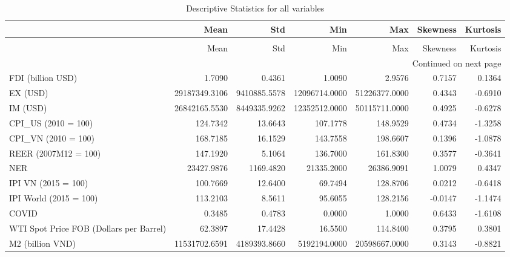 \begin{longtable}{lrrrrrr}
\caption{Descriptive Statistics for all variables} \label{tab:desc_stats} \\
\toprule
 & Mean & Std & Min & Max & Skewness & Kurtosis \\
\midrule
\endfirsthead
\caption[]{Descriptive Statistics for all variables} \\
\toprule
 & Mean & Std & Min & Max & Skewness & Kurtosis \\
\midrule
\endhead
\midrule
\multicolumn{7}{r}{Continued on next page} \\
\midrule
\endfoot
\bottomrule
\endlastfoot
FDI (billion USD) & 1.7090 & 0.4361 & 1.0090 & 2.9576 & 0.7157 & 0.1364 \\
EX (USD) & 29187349.3106 & 9410885.5578 & 12096714.0000 & 51226377.0000 & 0.4343 & -0.6910 \\
IM (USD) & 26842165.5530 & 8449335.9262 & 12352512.0000 & 50115711.0000 & 0.4925 & -0.6278 \\
CPI\_US (2010 = 100) & 124.7342 & 13.6643 & 107.1778 & 148.9529 & 0.4734 & -1.3258 \\
CPI\_VN (2010 = 100) & 168.7185 & 16.1529 & 143.7558 & 198.6607 & 0.1396 & -1.0878 \\
REER (2007M12 = 100) & 147.1920 & 5.1064 & 136.7000 & 161.8300 & 0.3577 & -0.3641 \\
NER & 23427.9876 & 1169.4820 & 21335.2000 & 26386.9091 & 1.0079 & 0.4347 \\
IPI VN (2015 = 100) & 100.7669 & 12.6400 & 69.7494 & 128.8706 & 0.0212 & -0.6418 \\
IPI World (2015 = 100) & 113.2103 & 8.5611 & 95.6055 & 128.2156 & -0.0147 & -1.1474 \\
COVID & 0.3485 & 0.4783 & 0.0000 & 1.0000 & 0.6433 & -1.6108 \\
WTI Spot Price FOB (Dollars per Barrel) & 62.3897 & 17.4428 & 16.5500 & 114.8400 & 0.3795 & 0.3801 \\
M2 (billion VND) & 11531702.6591 & 4189393.8660 & 5192194.0000 & 20598667.0000 & 0.3143 & -0.8821 \\
\end{longtable}
